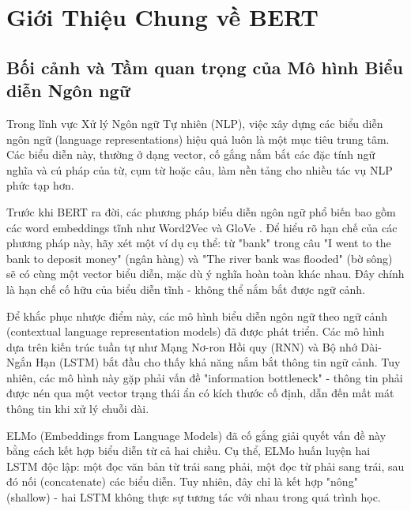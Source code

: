 \section{Giới Thiệu Chung về BERT}
\label{sec:gioi_thieu_chung_bert}

\subsection{Bối cảnh và Tầm quan trọng của Mô hình Biểu diễn Ngôn ngữ}
\label{ssec:boi_canh_bieu_dien_ngon_ngu}
Trong lĩnh vực Xử lý Ngôn ngữ Tự nhiên (NLP), việc xây dựng các biểu diễn ngôn ngữ (language representations) hiệu quả luôn là một mục tiêu trung tâm. Các biểu diễn này, thường ở dạng vector, cố gắng nắm bắt các đặc tính ngữ nghĩa và cú pháp của từ, cụm từ hoặc câu, làm nền tảng cho nhiều tác vụ NLP phức tạp hơn. 

Trước khi BERT ra đời, các phương pháp biểu diễn ngôn ngữ phổ biến bao gồm các word embeddings tĩnh như Word2Vec \cite{mikolov2013distributed} và GloVe \cite{pennington2014glove}. Để hiểu rõ hạn chế của các phương pháp này, hãy xét một ví dụ cụ thể: từ "bank" trong câu "I went to the bank to deposit money" (ngân hàng) và "The river bank was flooded" (bờ sông) sẽ có cùng một vector biểu diễn, mặc dù ý nghĩa hoàn toàn khác nhau. Đây chính là hạn chế cố hữu của biểu diễn tĩnh - không thể nắm bắt được ngữ cảnh.

Để khắc phục nhược điểm này, các mô hình biểu diễn ngôn ngữ theo ngữ cảnh (contextual language representation models) đã được phát triển. Các mô hình dựa trên kiến trúc tuần tự như Mạng Nơ-ron Hồi quy (RNN) và Bộ nhớ Dài-Ngắn Hạn (LSTM) bắt đầu cho thấy khả năng nắm bắt thông tin ngữ cảnh. Tuy nhiên, các mô hình này gặp phải vấn đề "information bottleneck" - thông tin phải được nén qua một vector trạng thái ẩn có kích thước cố định, dẫn đến mất mát thông tin khi xử lý chuỗi dài.

ELMo (Embeddings from Language Models) \cite{peters2018deep} đã cố gắng giải quyết vấn đề này bằng cách kết hợp biểu diễn từ cả hai chiều. Cụ thể, ELMo huấn luyện hai LSTM độc lập: một đọc văn bản từ trái sang phải, một đọc từ phải sang trái, sau đó nối (concatenate) các biểu diễn. Tuy nhiên, đây chỉ là kết hợp "nông" (shallow) - hai LSTM không thực sự tương tác với nhau trong quá trình học.

